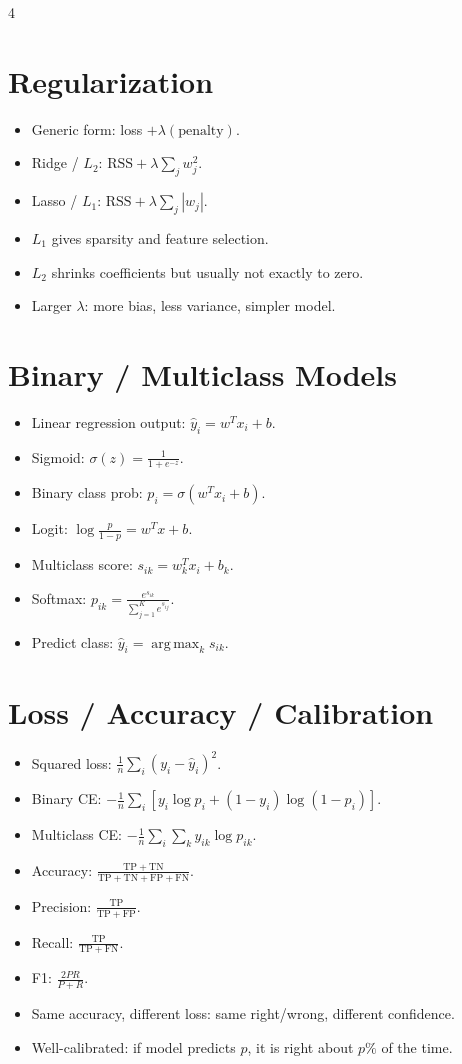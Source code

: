 \documentclass[11pt,landscape]{article}
\newcommand{\TP}{\mathrm{TP}}
\newcommand{\TN}{\mathrm{TN}}
\newcommand{\FP}{\mathrm{FP}}
\newcommand{\FN}{\mathrm{FN}}
\newcommand{\argmax}{\operatorname*{arg\,max}}
\begin{document}
\begin{multicols}{4}
		\section{Regularization}
		\begin{itemize}
			\item Generic form: loss $+\lambda(\text{penalty})$.
			\item Ridge / $L_2$: $\mathrm{RSS}+\lambda\sum_j w_j^2$.
			\item Lasso / $L_1$: $\mathrm{RSS}+\lambda\sum_j |w_j|$.
			\item $L_1$ gives sparsity and feature selection.
			\item $L_2$ shrinks coefficients but usually not exactly to zero.
			\item Larger $\lambda$: more bias, less variance, simpler model.
		\end{itemize}
		
		\section{Binary / Multiclass Models}
		\begin{itemize}
			\item Linear regression output: $\hat y_i=w^Tx_i+b$.
			\item Sigmoid: $\sigma(z)=\frac{1}{1+e^{-z}}$.
			\item Binary class prob: $p_i=\sigma(w^Tx_i+b)$.
			\item Logit: $\log\frac{p}{1-p}=w^Tx+b$.
			\item Multiclass score: $s_{ik}=w_k^Tx_i+b_k$.
			\item Softmax: $p_{ik}=\frac{e^{s_{ik}}}{\sum_{j=1}^K e^{s_{ij}}}$.
			\item Predict class: $\hat y_i=\argmax_k s_{ik}$.
		\end{itemize}
		
		\section{Loss / Accuracy / Calibration}
		\begin{itemize}
			\item Squared loss: $\frac{1}{n}\sum_i (y_i-\hat y_i)^2$.
			\item Binary CE: $-\frac{1}{n}\sum_i \left[y_i\log p_i+(1-y_i)\log(1-p_i)\right]$.
			\item Multiclass CE: $-\frac{1}{n}\sum_i\sum_k y_{ik}\log p_{ik}$.
			\item Accuracy: $\frac{\TP+\TN}{\TP+\TN+\FP+\FN}$.
			\item Precision: $\frac{\TP}{\TP+\FP}$.
			\item Recall: $\frac{\TP}{\TP+\FN}$.
			\item F1: $\frac{2PR}{P+R}$.
			\item Same accuracy, different loss: same right/wrong, different confidence.
			\item Well-calibrated: if model predicts $p$, it is right about $p\%$ of the time.
		\end{itemize}
		

\end{multicols}
\end{document}
